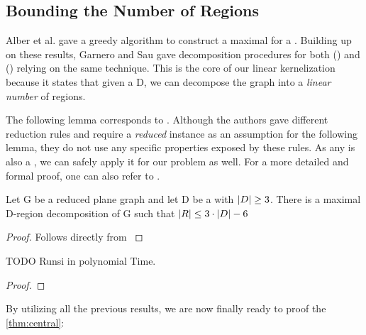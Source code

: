 

\subsection{Bounding the Number of Regions}

Alber et al. \cite[Proposition 1]{Alber2004} gave a greedy algorithm to construct a maximal \dreg for a \dom. Building up on these results, Garnero and Sau gave decomposition procedures for both \rbdom (\cite{Garnero2017a}) and \tdom (\cite{Garnero2018}) relying on the same technique. This is the core of our linear kernelization because it states that given a \dom D, we can decompose the graph into a \textit{linear number} of regions.


The following lemma corresponds to \cite[Proposition 1 and Lemma 5]{Alber2004}. Although the authors gave different reduction rules and require a \textit{reduced} instance as an assumption for the following lemma, they do not use any specific properties exposed by these rules. 
As any \sdom is also a \dom, we can safely apply it for our problem as well. For a more detailed and formal proof, one can also refer to \cite[Proposition 1]{Garnero2018}.

\begin{lemma}\label{lemma:numRegions}
    Let G be a reduced plane graph and let D be a \sdom with $\abs{D}\geq 3$. There is a maximal D-region decomposition of G such that $\abs{R} \leq 3 \cdot \abs{D} - 6$
\end{lemma}
\begin{proof} 
    Follows directly from \cite[Proposition 1 and Lemma 5]{Alber2004}
\end{proof}


\begin{lemma}\label{lemma:runtime}
    TODO Runsi in polynomial Time. 
\end{lemma}
\begin{proof} 
\end{proof}

\noindent By utilizing all the previous results, we are now finally ready to proof the \cref{thm:central}: 

